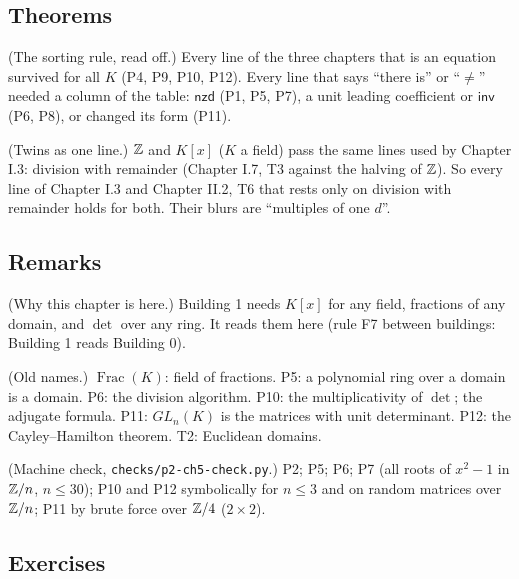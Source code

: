 \subsection*{Theorems}

\begin{lines}
\item[\lab{T1}] (The sorting rule, read off.) Every line of the three chapters that is an equation survived for all $K$ (P4, P9, P10, P12). Every line that says ``there is'' or ``$\ne$'' needed a column of the table: $\mathsf{nzd}$ (P1, P5, P7), a unit leading coefficient or $\mathsf{inv}$ (P6, P8), or changed its form (P11).
\item[\lab{T2}] (Twins as one line.) $\mathbb{Z}$ and $K[x]$ ($K$ a field) pass the same lines used by Chapter I.3: division with remainder (Chapter I.7, T3 against the halving of $\mathbb{Z}$). So every line of Chapter I.3 and Chapter II.2, T6 that rests only on division with remainder holds for both. Their blurs are ``multiples of one $d$''.
\end{lines}

\subsection*{Remarks}

\begin{lines}
\item[\lab{R1}] (Why this chapter is here.) Building 1 needs $K[x]$ for any field, fractions of any domain, and $\det$ over any ring. It reads them here (rule F7 between buildings: Building 1 reads Building 0).
\item[\lab{R2}] (Old names.) $\operatorname{Frac}(K)$: field of fractions. P5: a polynomial ring over a domain is a domain. P6: the division algorithm. P10: the multiplicativity of $\det$; the adjugate formula. P11: $GL_n(K)$ is the matrices with unit determinant. P12: the Cayley--Hamilton theorem. T2: Euclidean domains.
\item[\lab{R3}] (Machine check, \texttt{checks/p2-ch5-check.py}.) P2; P5; P6; P7 (all roots of $x^2 - 1$ in $\mathbb{Z}/n$, $n \le 30$); P10 and P12 symbolically for $n \le 3$ and on random matrices over $\mathbb{Z}/n$; P11 by brute force over $\mathbb{Z}/4$ ($2 \times 2$).
\end{lines}

\subsection*{Exercises}

